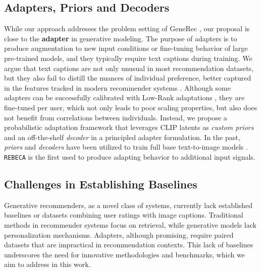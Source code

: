 \subsection{Adapters, Priors and Decoders}
While our approach addresses the problem setting of GeneRec \cite{wang2024generativerecommendationnextgenerationrecommender}, our proposal is close to the \textbf{adapter} in generative modeling. The purpose of adapters is to produce augmentation to new input conditions or fine-tuning behavior \cite{zhang2023adding, ye2023ip-adapter} of large pre-trained models, and they typically require text captions during training. We argue that text captions are not only unusual in most recommendation datasets, but they also fail to distill the nuances of individual preference, better captured in the features tracked in modern recommender systems \cite{zhai2024actionsspeaklouderwords}. Although some adapters can be successfully calibrated with Low-Rank adaptations \cite{hu2021loralowrankadaptationlarge}, they are fine-tuned  per user, which not only leads to poor scaling properties, but also does not benefit from correlations between individuals. Instead, we propose a probabilistic adaptation framework that leverages CLIP latents as \textit{custom priors} and an off-the-shelf \textit{decoder} in a principled adapter formulation. In the past, \textit{priors} and \textit{decoders} have been utilized to train full base text-to-image models \cite{pradeep-etal-2023-generative}. \texttt{REBECA} is the first used to produce adapting behavior to additional input signals.


\subsection{Challenges in Establishing Baselines} 


Generative recommenders, as a novel class of systems, currently lack established baselines or datasets combining user ratings with image captions. Traditional methods in recommender systems focus on retrieval, while generative models lack personalization mechanisms. Adapters, although promising, require paired datasets that are impractical in recommendation contexts. This lack of baselines underscores the need for innovative methodologies and benchmarks, which we aim to address in this work.